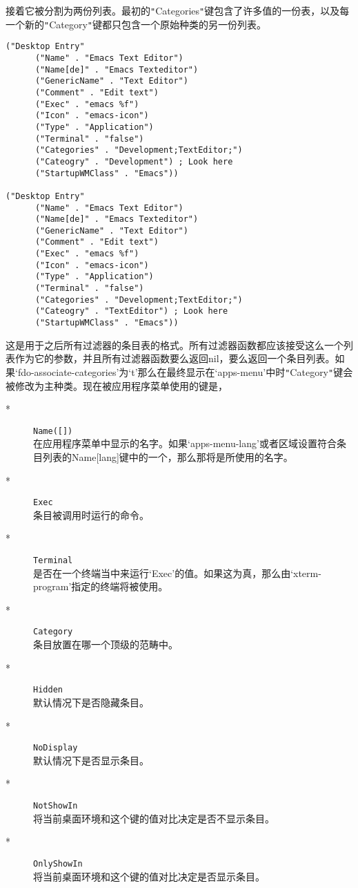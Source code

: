 \documentclass{book}
\begin{document}
\begin{CJK*}{UTF8}{gbsn}
接着它被分割为两份列表。最初的\verb|"|Categories\verb|"|键包含了许多值的一份表，以及每一个新的\verb|"|Category\verb|"|键都只包含一个原始种类的另一份列表。
\begin{verbatim}
("Desktop Entry"
      ("Name" . "Emacs Text Editor")
      ("Name[de]" . "Emacs Texteditor")
      ("GenericName" . "Text Editor")
      ("Comment" . "Edit text")
      ("Exec" . "emacs %f")
      ("Icon" . "emacs-icon")
      ("Type" . "Application")
      ("Terminal" . "false")
      ("Categories" . "Development;TextEditor;")
      ("Cateogry" . "Development") ; Look here
      ("StartupWMClass" . "Emacs"))

("Desktop Entry"
      ("Name" . "Emacs Text Editor")
      ("Name[de]" . "Emacs Texteditor")
      ("GenericName" . "Text Editor")
      ("Comment" . "Edit text")
      ("Exec" . "emacs %f")
      ("Icon" . "emacs-icon")
      ("Type" . "Application")
      ("Terminal" . "false")
      ("Categories" . "Development;TextEditor;")
      ("Cateogry" . "TextEditor") ; Look here
      ("StartupWMClass" . "Emacs"))
\end{verbatim}
这是用于之后所有过滤器的条目表的格式。所有过滤器函数都应该接受这么一个列表作为它的参数，并且所有过滤器函数要么返回nil，要么返回一个条目列表。如果`fdo-associate-categories'为`t'那么在最终显示在`apps-menu'中时\verb|"|Category\verb|"|键会被修改为主种类。现在被应用程序菜单使用的键是，
\begin{description}
\item[*] \verb|Name([])|\\
在应用程序菜单中显示的名字。如果`apps-menu-lang'或者区域设置符合条目列表的Name[lang]键中的一个，那么那将是所使用的名字。
\item[*] \verb|Exec|\\
条目被调用时运行的命令。
\item[*] \verb|Terminal|\\
是否在一个终端当中来运行`Exec'的值。如果这为真，那么由`xterm-program'指定的终端将被使用。
\item[*] \verb|Category|\\
条目放置在哪一个顶级的范畴中。
\item[*] \verb|Hidden|\\
默认情况下是否隐藏条目。
\item[*] \verb|NoDisplay|\\
默认情况下是否显示条目。
\item[*] \verb|NotShowIn|\\
将当前桌面环境和这个键的值对比决定是否不显示条目。
\item[*] \verb|OnlyShowIn|\\
将当前桌面环境和这个键的值对比决定是否显示条目。
\end{description}

\end{CJK*}
\end{document}
